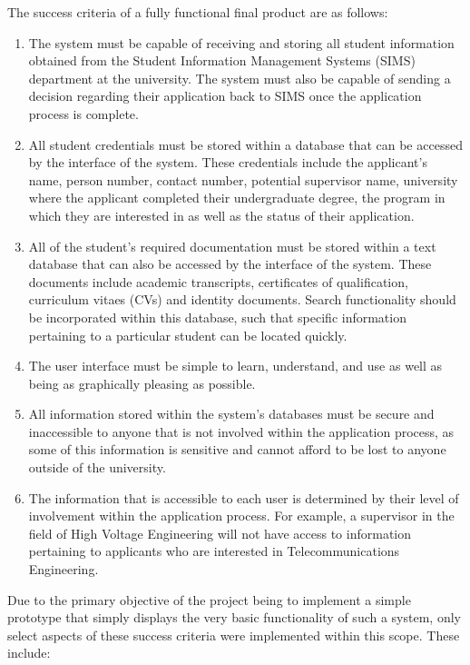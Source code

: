 \documentclass[journal]{IEEEtran}
\begin{document}
\hfill \break The success criteria of a fully functional final product are as follows:

\begin{enumerate}
	\item The system must be capable of receiving and storing all student information obtained from the Student Information Management Systems (SIMS) department at the university. The system must also be capable of sending a decision regarding their application back to SIMS once the application process is complete.
	\item All student credentials must be stored within a database that can be accessed by the interface of the system. These credentials include the applicant's name, person number, contact number, potential supervisor name, university where the applicant completed their undergraduate degree, the program in which they are interested in as well as the status of their application.
	\item All of the student's required documentation must be stored within a text database that can also be accessed by the interface of the system. These documents include academic transcripts, certificates of qualification, curriculum vitaes (CVs) and identity documents. Search functionality should be incorporated within this database, such that specific information pertaining to a particular student can be located quickly.
	\item The user interface must be simple to learn, understand, and use as well as being as graphically pleasing as possible.
	\item All information stored within the system's databases must be secure and inaccessible to anyone that is not involved within the application process, as some of this information is sensitive and cannot afford to be lost to anyone outside of the university.
	\item The information that is accessible to each user is determined by their level of involvement within the application process. For example, a supervisor in the field of High Voltage Engineering will not have access to information pertaining to applicants who are interested in Telecommunications Engineering.
\end{enumerate}

\hfill \break Due to the primary objective of the project being to implement a simple prototype that simply displays the very basic functionality of such a system, only select aspects of these success criteria were implemented within this scope. These include:
\end{document}
